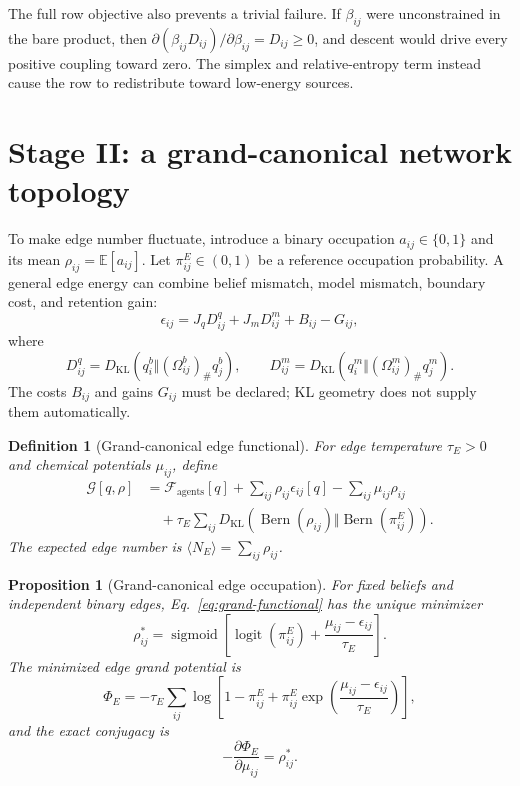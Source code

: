 \documentclass[11pt,letterpaper]{article}
\newcommand{\KL}{D_{\mathrm{KL}}}
\newcommand{\E}{\mathbb E}
\newcommand{\cF}{\mathcal F}
\newcommand{\cG}{\mathcal G}
\newcommand{\push}{_{\#}}
\newcommand{\Bern}{\operatorname{Bern}}
\newcommand{\logit}{\operatorname{logit}}
\newcommand{\sigmoid}{\operatorname{sigmoid}}
\newtheorem{definition}{Definition}
\newtheorem{proposition}{Proposition}
\begin{document}
The full row objective also prevents a trivial failure.  If $\beta_{ij}$ were unconstrained in the bare product, then $\partial(\beta_{ij}D_{ij})/\partial\beta_{ij}=D_{ij}\geq0$, and descent would drive every positive coupling toward zero.  The simplex and relative-entropy term instead cause the row to redistribute toward low-energy sources.

\section{Stage II: a grand-canonical network topology}

To make edge number fluctuate, introduce a binary occupation $a_{ij}\in\{0,1\}$ and its mean $\rho_{ij}=\E[a_{ij}]$.  Let $\pi_{ij}^{E}\in(0,1)$ be a reference occupation probability.  A general edge energy can combine belief mismatch, model mismatch, boundary cost, and retention gain:
\begin{equation}
 \epsilon_{ij}
 =J_qD_{ij}^{q}+J_mD_{ij}^{m}+B_{ij}-G_{ij},
 \label{eq:edge-energy}
\end{equation}
where
\begin{equation}
 D_{ij}^{q}=\KL\left(q_i^b\Vert(\Omega_{ij}^b)\push q_j^b\right),
 \qquad
 D_{ij}^{m}=\KL\left(q_i^m\Vert(\Omega_{ij}^m)\push q_j^m\right).
\end{equation}
The costs $B_{ij}$ and gains $G_{ij}$ must be declared; KL geometry does not supply them automatically.

\begin{definition}[Grand-canonical edge functional]
For edge temperature $\tau_E>0$ and chemical potentials $\mu_{ij}$, define
\begin{align}
 \cG[q,\rho]
 &=\cF_{\mathrm{agents}}[q]
 +\sum_{ij}\rho_{ij}\epsilon_{ij}[q]
 -\sum_{ij}\mu_{ij}\rho_{ij}
 \nonumber\\
 &\quad+\tau_E\sum_{ij}
 \KL\left(\Bern(\rho_{ij})\Vert\Bern(\pi_{ij}^{E})\right).
 \label{eq:grand-functional}
\end{align}
The expected edge number is $\langle N_E\rangle=\sum_{ij}\rho_{ij}$.
\end{definition}

\begin{proposition}[Grand-canonical edge occupation]
For fixed beliefs and independent binary edges, Eq.~\eqref{eq:grand-functional} has the unique minimizer
\begin{equation}
 \boxed{
 \rho_{ij}^*
 =\sigmoid\left[
 \logit(\pi_{ij}^{E})
 +\frac{\mu_{ij}-\epsilon_{ij}}{\tau_E}
 \right].}
 \label{eq:fermi-edge-occupation}
\end{equation}
The minimized edge grand potential is
\begin{equation}
 \Phi_E
 =-\tau_E\sum_{ij}\log\left[
 1-\pi_{ij}^{E}
 +\pi_{ij}^{E}\exp\left(\frac{\mu_{ij}-\epsilon_{ij}}{\tau_E}\right)
 \right],
 \label{eq:edge-grand-potential}
\end{equation}
and the exact conjugacy is
\begin{equation}
 -\frac{\partial\Phi_E}{\partial\mu_{ij}}=\rho_{ij}^*.
 \label{eq:chemical-conjugacy}
\end{equation}
\end{proposition}
\end{document}
